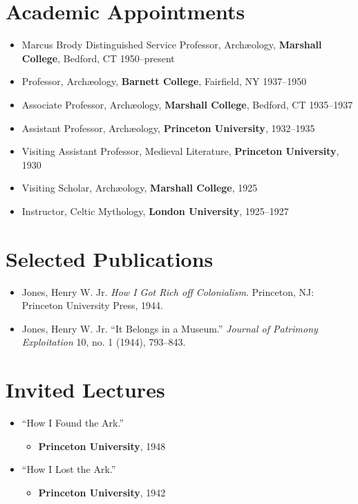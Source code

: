 \documentclass[%
    11pt,
  oneside
  ]{memoir}
\let\oldsection\section
\renewcommand{\section}[1]{%
  \oldsection*{#1}
  \leavevmode
  \par
  \vspace{\dimexpr-\baselineskip-\parskip}
}
\begin{document}
\hypertarget{academic-appointments}{%
\section{Academic Appointments}\label{academic-appointments}}

\begin{itemize}
\tightlist
\item
  Marcus Brody Distinguished Service Professor, Archæology,
  \textbf{Marshall College}, Bedford, CT 1950--present
\item
  Professor, Archæology, \textbf{Barnett College}, Fairfield, NY
  1937--1950
\item
  Associate Professor, Archæology, \textbf{Marshall College}, Bedford,
  CT 1935--1937
\item
  Assistant Professor, Archæology, \textbf{Princeton University},
  1932--1935
\item
  Visiting Assistant Professor, Medieval Literature, \textbf{Princeton
  University}, 1930
\item
  Visiting Scholar, Archæology, \textbf{Marshall College}, 1925
\item
  Instructor, Celtic Mythology, \textbf{London University}, 1925--1927
\end{itemize}

\hypertarget{selected-publications}{%
\section{Selected Publications}\label{selected-publications}}

\begin{itemize}
\tightlist
\item
  Jones, Henry W. Jr. \emph{How I Got Rich off Colonialism}. Princeton,
  NJ: Princeton University Press, 1944.
\item
  Jones, Henry W. Jr. ``It Belongs in a Museum.'' \emph{Journal of
  Patrimony Exploitation} 10, no. 1 (1944), 793--843.
\end{itemize}

\hypertarget{invited-lectures}{%
\section{Invited Lectures}\label{invited-lectures}}

\begin{itemize}
\tightlist
\item
  ``How I Found the Ark.''

  \begin{itemize}
  \tightlist
  \item
    \textbf{Princeton University}, 1948
  \end{itemize}
\item
  ``How I Lost the Ark.''

  \begin{itemize}
  \tightlist
  \item
    \textbf{Princeton University}, 1942
  \end{itemize}
\end{itemize}
\end{document}
